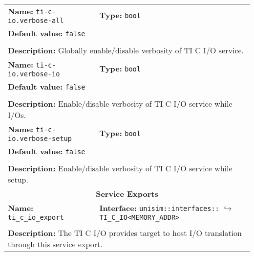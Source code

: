 \newpage
\begin{center}
	\begin{tabular}{|p{7.5cm}|p{7.5cm}|}
		\hline
		\multicolumn{1}{|p{7.5cm}}{\textbf{Name:} \texttt{ti-c-io.verbose-all}} & \multicolumn{1}{p{7.5cm}|}{\textbf{Type:} \texttt{bool}}\\
		\multicolumn{2}{|p{15cm}|}{\textbf{Default value:} \texttt{false}}\\
		\multicolumn{2}{|l|}{}\\
		\multicolumn{2}{|p{15cm}|}{\textbf{Description:} \newline Globally enable/disable verbosity of TI C I/O service.}\\
		\hline
		\multicolumn{1}{|p{7.5cm}}{\textbf{Name:} \texttt{ti-c-io.verbose-io}} & \multicolumn{1}{p{7.5cm}|}{\textbf{Type:} \texttt{bool}}\\
		\multicolumn{2}{|p{15cm}|}{\textbf{Default value:} \texttt{false}}\\
		\multicolumn{2}{|l|}{}\\
		\multicolumn{2}{|p{15cm}|}{\textbf{Description:} \newline Enable/disable verbosity of TI C I/O service while I/Os.}\\
		\hline
		\multicolumn{1}{|p{7.5cm}}{\textbf{Name:} \texttt{ti-c-io.verbose-setup}} & \multicolumn{1}{p{7.5cm}|}{\textbf{Type:} \texttt{bool}}\\
		\multicolumn{2}{|p{15cm}|}{\textbf{Default value:} \texttt{false}}\\
		\multicolumn{2}{|l|}{}\\
		\multicolumn{2}{|p{15cm}|}{\textbf{Description:} \newline Enable/disable verbosity of TI C I/O service while setup.}\\
		\hline
		\hline
		\multicolumn{2}{|c|}{\textbf{\large Service Exports}}\\
		\hline
		\multicolumn{1}{|p{7.5cm}}{\textbf{Name:} \texttt{ti\_c\_io\_export}} & \multicolumn{1}{p{7.5cm}|}{\textbf{Interface:} \newline \texttt{unisim::interfaces::} \newline$\hookrightarrow$\texttt{TI\_C\_IO<MEMORY\_ADDR>}}\\
		\multicolumn{2}{|l|}{}\\
		\multicolumn{2}{|p{15cm}|}{\textbf{Description:} \newline The TI C I/O provides target to host I/O translation through this service export.}\\
		\hline
		\hline

\end{tabular}
\end{center}
